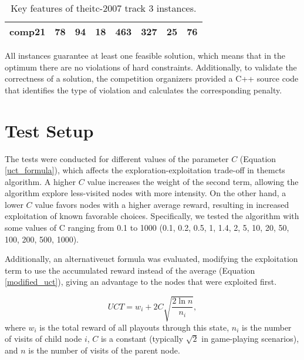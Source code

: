 \begin{table}[h!]
\begin{center}
\begin{tabular}{ |c|c|c|c|c|c|c|c| }
comp21                                    & 78                                         & 94                                       & 18                                     & 463                                          & 327                                       & 25                                       & 76 					\\
\hline                                      
\end{tabular}
\caption{Key features of the\ac{itc-2007} track 3 instances.}
\label{itc_instance_features}
\end{center}
\end{table}

All instances guarantee at least one feasible solution, which means that in the optimum there are no violations of hard constraints. Additionally, to validate the correctness of a solution, the competition organizers provided a C++ source code that identifies the type of violation and calculates the corresponding penalty.

\section{Test Setup}

The tests were conducted for different values of the parameter \(C\) (Equation \ref{uct_formula}), which affects the exploration-exploitation trade-off in the\ac{mcts} algorithm. A higher \(C\) value increases the weight of the second term, allowing the algorithm explore less-visited nodes with more intensity. On the other hand, a lower \(C\) value favors nodes with a higher average reward, resulting in increased exploitation of known favorable choices. Specifically, we tested the algorithm with some values of C ranging from 0.1 to 1000 (0.1, 0.2, 0.5, 1, 1.4, 2, 5, 10, 20, 50, 100, 200, 500, 1000).

Additionally, an alternative\ac{uct} formula was evaluated, modifying the exploitation term to use the accumulated reward instead of the average (Equation \ref{modified_uct}), giving an advantage to the nodes that were exploited first.

\begin{equation}
UCT = w_i + 2C\sqrt{\frac{2\ln{n}}{n_i}},\label{modified_uct}
\end{equation} where \(w_i\) is the total reward of all playouts through this state, \(n_i\) is the number of visits of child node \(i\), \(C\) is a constant (typically \(\sqrt{2}\) in game-playing scenarios), and \(n\) is the number of visits of the parent node.

